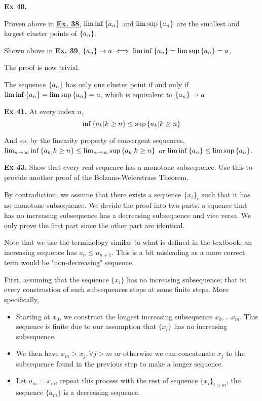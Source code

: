 \noindent {} \textbf{Ex 40.}

Proven above in \underline{\textbf{Ex. 38}}, $\liminf\left\{a_n\right\}$ and $\limsup\left\{a_n\right\}$ are the smallest and largest cluster points of $\left\{a_n\right\}$.

Shown above in \underline{\textbf{Ex. 39}}, $\left\{a_n\right\}\to a \iff \liminf\left\{a_n\right\} = \limsup\left\{a_n\right\} = a$.

The proof is now trivial.

The sequence $\left\{a_n\right\}$ has only one cluster point if and only if $\liminf\left\{a_n\right\} = \limsup\left\{a_n\right\} = a$, which is equivalent to $\left\{a_n\right\} \to a$.

\noindent {} \textbf{Ex 41.}
At every index $n$,
\[ \inf\left\{a_k | k \geq n\right\} \leq \sup\left\{a_k | k \geq n\right\} \]

And so, by the linearity property of convergent sequences, $\lim_{n\to\infty}\inf\left\{a_k | k \geq n\right\} \leq \lim_{n\to\infty}\sup\left\{a_k | k \geq n\right\}$ or $\liminf\left\{a_n\right\} \leq \limsup\left\{a_n\right\}$.

\noindent {} \textbf{Ex 43.} \label{ex:43} Show that every real sequence has a monotone subsequence. Use this to provide another proof of the Bolzano-Weierstrass Theorem. 

By contradiction, we assume that there exists a sequence $\{x_i\}_i$ such that it has no monotone subsequence. We devide the proof into two parts: a squence that has no increasing subsequence has a decreasing subsequence and vice versa. We only prove the first part since the other part are identical.

Note that we use the terminology similar to what is defined in the textbook: an increasing sequence has $a_n \leq a_{n+1}$. This is a bit misleading as a more correct term would be "non-decreasing" sequence. 

First, assuming that the sequence $\{x_i\}$ has no increasing subsequence; that is: every construstion of such subsequences stops at some finite steps. More specifically, 

\begin{itemize}
    \item Starting at $x_0$, we construct the longest increasing subsequence ${x_0, \dots x_m}$. This sequence is finite due to our assumption that $\{x_i\}$ has no increasing subsequence. 
    \item We then have $x_m>x_j, \forall j > m$ or otherwise we can concatenate $x_j$ to the subsequence found in the previous step to make a longer sequence.
    \item Let $a_m = x_m$, repeat this process with the rest of sequence $\{x_i\}_{i>m}$, the sequence $\{a_m\}$ is a decreasing sequence. 
\end{itemize}

